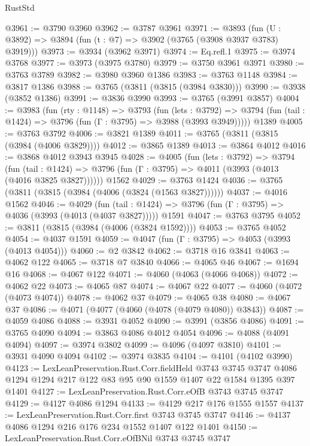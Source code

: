 \begin{lexlean}{RustStd}
\begin{coremodule}
@3961 := @3790 @3960
@3962 := @3787 @3961
@3971 := @3893 (fun (U : @3892) => @3894 (fun (t : @7) => @3902 (@3765 (@3908 @3937 @3783) @3919)))
@3973 := @3934 (@3962 @3971)
@3974 := Eq.refl.{1}
@3975 := @3974 @3768
@3977 := @3973 (@3975 @3780)
@3979 := @3750 @3961 @3971
@3980 := @3763 @3789
@3982 := @3980 @3960 @1386
@3983 := @3763 @1148
@3984 := @3817 @1386
@3988 := @3765 (@3811 (@3815 (@3984 @3830)))
@3990 := @3938 (@3852 @1386)
@3991 := @3836 @3990
@3993 := @3765 (@3991 @3857)
@4004 := @3983
    (fun (rty : @1148) =>
    @3793
      (fun (lets : @3792) =>
      @3794 (fun (tail : @1424) => @3796 (fun (Γ : @3795) => @3988 (@3993 @3949)))))
    @1389
@4005 := @3763 @3792
@4006 := @3821 @1389
@4011 := @3765 (@3811 (@3815 (@3984 (@4006 @3829))))
@4012 := @3865 @1389
@4013 := @3864 @4012
@4016 := @3868 @4012 @3943 @3945
@4028 := @4005
    (fun (lets : @3792) =>
    @3794
      (fun (tail : @1424) => @3796 (fun (Γ : @3795) => @4011 (@3993 (@4013 (@4016 @3825 @3827))))))
    @1562
@4029 := @3763 @1424
@4036 := @3765 (@3811 (@3815 (@3984 (@4006 (@3824 (@1563 @3827))))))
@4037 := @4016 @1562
@4046 := @4029
    (fun (tail : @1424) => @3796 (fun (Γ : @3795) => @4036 (@3993 (@4013 (@4037 @3827)))))
    @1591
@4047 := @3763 @3795
@4052 := @3811 (@3815 (@3984 (@4006 (@3824 @1592))))
@4053 := @3765 @4052
@4054 := @4037 @1591
@4059 := @4047 (fun (Γ : @3795) => @4053 (@3993 (@4013 @4054)))
@4060 := @2 @3842
@4062 := @3718 @16 @3841
@4063 := @4062 @122
@4065 := @3718 @7 @3840
@4066 := @4065 @46
@4067 := @1694 @16
@4068 := @4067 @122
@4071 := @4060 (@4063 (@4066 @4068))
@4072 := @4062 @22
@4073 := @4065 @87
@4074 := @4067 @22
@4077 := @4060 (@4072 (@4073 @4074))
@4078 := @4062 @37
@4079 := @4065 @38
@4080 := @4067 @37
@4086 := @4071 (@4077 (@4060 (@4078 (@4079 @4080)) @3843))
@4087 := @4059 @4086
@4088 := @3931 @4052
@4090 := @3991 (@3856 @4086)
@4091 := @3765 @4090
@4094 := @3863 @4086 @4012 @4054
@4096 := @4088 (@4091 @4094)
@4097 := @3974 @3802
@4099 := @4096 (@4097 @3810)
@4101 := @3931 @4090 @4094
@4102 := @3974 @3835
@4104 := @4101 (@4102 @3990)
@4123 := LexLeanPreservation.Rust.Corr.fieldHeld
    @3743
    @3745
    @3747
    @4086
    @1294
    @1294
    @217
    @122
    @83
    @95
    @90
    @1559
    @1407
    @22
    @1584
    @1395
    @397
    @1401
@4127 := LexLeanPreservation.Rust.Corr.eOfB @3743 @3745 @3747
@4129 := @4127 @4086 @1294
@4133 := @4129 @217 @176 @1555 @1557
@4137 := LexLeanPreservation.Rust.Corr.first @3743 @3745 @3747
@4146 := @4137 @4086 @1294 @216 @176 @234 @1552 @1407 @122 @1401
@4150 := LexLeanPreservation.Rust.Corr.eOfBNil @3743 @3745 @3747

\end{coremodule}
\end{lexlean}
